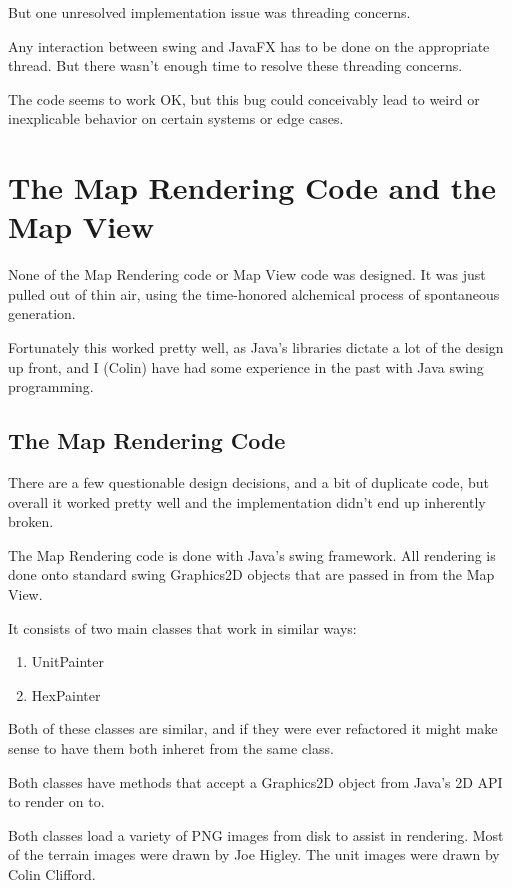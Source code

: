 \documentclass[12pt,a4paper]{article}
\begin{document}
But one unresolved implementation issue was threading concerns.

Any interaction between swing and JavaFX has to be done on the appropriate
thread. But there wasn't enough time to resolve these threading concerns.

The code seems to work OK, but this bug could conceivably lead to weird
or inexplicable behavior on certain systems or edge cases.

\section{The Map Rendering Code and the Map View}

None of the Map Rendering code or Map View code was designed.
It was just pulled out of thin air, using the time-honored alchemical process
of spontaneous generation.

Fortunately this worked pretty well, as Java's libraries dictate a lot
of the design up front, and I (Colin) have had some experience in the past
with Java swing programming.

\subsection{The Map Rendering Code}
There are a few questionable design decisions, and a bit of duplicate code,
but overall it worked pretty well and the implementation didn't end up
inherently broken.

The Map Rendering code is done with Java's swing framework. All rendering
is done onto standard swing Graphics2D objects that are passed in from the
Map View.

It consists of two main classes that work in similar ways:
\begin{enumerate}
\item{UnitPainter}
\item{HexPainter}
\end{enumerate}

Both of these classes are similar, and if they were ever refactored it might
make sense to have them both inheret from the same class.

Both classes have methods that accept a Graphics2D object from Java's 2D API
to render on to.

Both classes load a variety of PNG images from disk to assist in rendering.
Most of the terrain images were drawn by Joe Higley.
The unit images were drawn by Colin Clifford.
\end{document}
